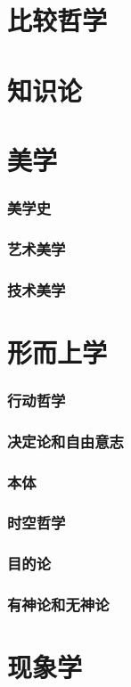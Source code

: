 \documentclass[UTF8]{../RepresentationUniverse}
\begin{document}
\chapter{比较哲学}
\chapter{知识论}




\chapter{美学}
    \subsection{美学史}
    \subsection{艺术美学}
    \subsection{技术美学}



\chapter{形而上学}
    \subsection{行动哲学}
    \subsection{决定论和自由意志}
    \subsection{本体}
    \subsection{时空哲学}
    \subsection{目的论}
    \subsection{有神论和无神论}


\chapter{现象学}
\end{document}
